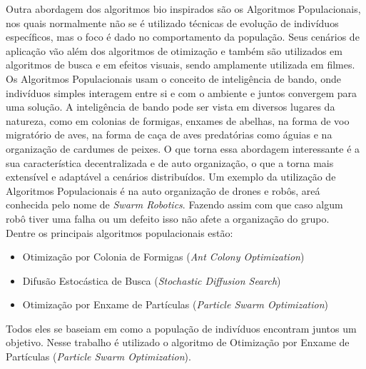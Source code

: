 Outra abordagem dos algoritmos bio inspirados são os Algoritmos Populacionais, nos quais normalmente não se é utilizado técnicas de evolução de indivíduos específicos, mas o foco é dado no comportamento da população. 
%
Seus cenários de aplicação vão além dos algoritmos de otimização e também são utilizados em algoritmos de busca e em efeitos visuais, sendo amplamente utilizada em filmes. 
%
Os Algoritmos Populacionais usam o conceito de inteligência de bando, onde indivíduos simples interagem entre si e com o ambiente e juntos convergem para uma solução. 
%
A inteligência de bando pode ser vista em diversos lugares da natureza, como em colonias de formigas, enxames de abelhas, na forma de voo migratório de aves, na forma de caça de aves predatórias como águias e na organização de cardumes de peixes. 
%
O que torna essa abordagem interessante é a sua característica decentralizada e de auto organização, o que a torna mais extensível e adaptável a cenários distribuídos. 
%
Um exemplo da utilização de Algoritmos Populacionais é na auto organização de drones e robôs, areá conhecida pelo nome de \textit{Swarm Robotics}. Fazendo assim com que caso algum robô tiver uma falha ou um defeito isso não afete a organização do grupo.\\
        
        \noindent Dentre os principais algoritmos populacionais estão:
        \begin{itemize}
            \item Otimização por Colonia de Formigas (\textit{Ant Colony Optimization}) 
            \item Difusão Estocástica de Busca (\textit{Stochastic Diffusion Search})
            \item Otimização por Enxame de Partículas (\textit{Particle Swarm Optimization})
        \end{itemize}
        
        Todos eles se baseiam em como a população de indivíduos encontram juntos um objetivo. Nesse trabalho é utilizado o algoritmo de Otimização por Enxame de Partículas (\textit{Particle Swarm Optimization}). 


